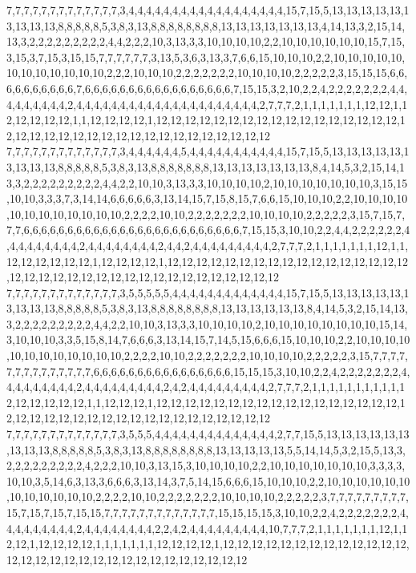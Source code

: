 7,7,7,7,7,7,7,7,7,7,7,7,7,3,4,4,4,4,4,4,4,4,4,4,4,4,4,4,4,4,4,4,15,7,15,5,13,13,13,13,13,13,13,13,13,8,8,8,8,8,5,3,8,3,13,8,8,8,8,8,8,8,8,13,13,13,13,13,13,13,4,14,13,3,2,15,14,13,3,2,2,2,2,2,2,2,2,2,4,4,2,2,2,10,3,13,3,3,10,10,10,10,2,2,10,10,10,10,10,10,15,7,15,3,15,3,7,15,3,15,15,7,7,7,7,7,7,3,13,5,3,6,3,13,3,7,6,6,15,10,10,10,2,2,10,10,10,10,10,10,10,10,10,10,10,10,2,2,2,10,10,10,2,2,2,2,2,2,2,10,10,10,10,2,2,2,2,2,3,15,15,15,6,6,6,6,6,6,6,6,6,6,7,6,6,6,6,6,6,6,6,6,6,6,6,6,6,6,6,6,7,15,15,3,2,10,2,2,4,2,2,2,2,2,2,2,4,4,4,4,4,4,4,4,4,2,4,4,4,4,4,4,4,4,4,4,4,4,4,4,4,4,4,4,4,4,4,2,7,7,7,2,1,1,1,1,1,1,1,12,12,1,12,12,12,12,12,1,1,12,12,12,12,1,12,12,12,12,12,12,12,12,12,12,12,12,12,12,12,12,12,12,12,12,12,12,12,12,12,12,12,12,12,12,12,12,12,12,12,12
7,7,7,7,7,7,7,7,7,7,7,7,7,3,4,4,4,4,4,4,5,4,4,4,4,4,4,4,4,4,4,4,15,7,15,5,13,13,13,13,13,13,13,13,13,8,8,8,8,8,5,3,8,3,13,8,8,8,8,8,8,8,13,13,13,13,13,13,13,8,4,14,5,3,2,15,14,13,3,2,2,2,2,2,2,2,2,2,4,4,2,2,10,10,3,13,3,3,10,10,10,10,2,10,10,10,10,10,10,10,3,15,15,10,10,3,3,3,7,3,14,14,6,6,6,6,6,3,13,14,15,7,15,8,15,7,6,6,15,10,10,10,2,2,10,10,10,10,10,10,10,10,10,10,10,10,2,2,2,2,10,10,2,2,2,2,2,2,2,10,10,10,10,2,2,2,2,2,3,15,7,15,7,7,7,6,6,6,6,6,6,6,6,6,6,6,6,6,6,6,6,6,6,6,6,6,6,6,6,6,7,15,15,3,10,10,2,2,4,4,2,2,2,2,2,2,4,4,4,4,4,4,4,4,4,2,4,4,4,4,4,4,4,4,2,4,4,2,4,4,4,4,4,4,4,4,4,2,7,7,7,2,1,1,1,1,1,1,1,12,1,1,12,12,12,12,12,12,1,12,12,12,12,1,12,12,12,12,12,12,12,12,12,12,12,12,12,12,12,12,12,12,12,12,12,12,12,12,12,12,12,12,12,12,12,12,12,12,12,12
7,7,7,7,7,7,7,7,7,7,7,7,7,3,5,5,5,5,5,4,4,4,4,4,4,4,4,4,4,4,4,4,15,7,15,5,13,13,13,13,13,13,13,13,13,8,8,8,8,8,5,3,8,3,13,8,8,8,8,8,8,8,8,13,13,13,13,13,13,8,4,14,5,3,2,15,14,13,3,2,2,2,2,2,2,2,2,2,4,4,2,2,10,10,3,13,3,3,10,10,10,10,2,10,10,10,10,10,10,10,10,15,14,3,10,10,10,3,3,5,15,8,14,7,6,6,6,3,13,14,15,7,14,5,15,6,6,6,15,10,10,10,2,2,10,10,10,10,10,10,10,10,10,10,10,10,2,2,2,2,10,10,2,2,2,2,2,2,2,10,10,10,10,2,2,2,2,2,3,15,7,7,7,7,7,7,7,7,7,7,7,7,7,7,6,6,6,6,6,6,6,6,6,6,6,6,6,6,6,6,15,15,15,3,10,10,2,2,4,2,2,2,2,2,2,2,4,4,4,4,4,4,4,4,4,2,4,4,4,4,4,4,4,4,4,2,4,2,4,4,4,4,4,4,4,4,4,2,7,7,7,2,1,1,1,1,1,1,1,1,1,1,12,12,12,12,12,12,1,1,12,12,12,1,12,12,12,12,12,12,12,12,12,12,12,12,12,12,12,12,12,12,12,12,12,12,12,12,12,12,12,12,12,12,12,12,12,12,12,12
7,7,7,7,7,7,7,7,7,7,7,7,7,3,5,5,5,4,4,4,4,4,4,4,4,4,4,4,4,4,4,2,7,7,15,5,13,13,13,13,13,13,13,13,13,8,8,8,8,8,5,3,8,3,13,8,8,8,8,8,8,8,8,13,13,13,13,13,5,5,14,14,5,3,2,15,5,13,3,2,2,2,2,2,2,2,2,2,4,2,2,2,10,10,3,13,15,3,10,10,10,10,2,2,10,10,10,10,10,10,10,3,3,3,3,10,10,3,5,14,6,3,13,3,6,6,6,3,13,14,3,7,5,14,15,6,6,6,15,10,10,10,2,2,10,10,10,10,10,10,10,10,10,10,10,10,2,2,2,2,10,10,2,2,2,2,2,2,2,10,10,10,10,2,2,2,2,2,3,7,7,7,7,7,7,7,7,7,15,7,15,7,15,7,15,15,7,7,7,7,7,7,7,7,7,7,7,7,7,15,15,15,15,3,10,10,2,2,4,2,2,2,2,2,2,2,4,4,4,4,4,4,4,4,4,2,4,4,4,4,4,4,4,4,2,2,4,2,4,4,4,4,4,4,4,4,4,10,7,7,7,2,1,1,1,1,1,1,1,12,1,12,12,1,12,12,12,12,1,1,1,1,1,1,1,12,12,12,12,1,12,12,12,12,12,12,12,12,12,12,12,12,12,12,12,12,12,12,12,12,12,12,12,12,12,12,12,12,12,12
